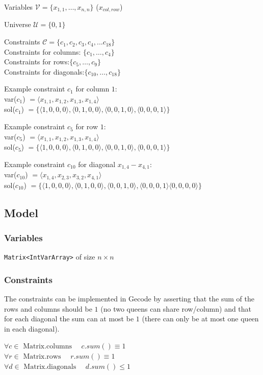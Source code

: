 \documentclass[a4paper, 11pt]{article}
\begin{document}
Variables $\mathcal{V} = \{x_{1,1}, \ldots, x_{n,n}\}$ ($x_{col,row}$)

Universe $\mathcal{U} = \{0,1\}$

Constraints $\mathcal{C} = \{c_1,c_2,c_3,c_4,...c_{18}\}$\\
Constraints for columns: $\{c_1, \ldots, c_4\}$\\
Constraints for rows:$\{c_5, \ldots, c_9\}$\\
Constraints for diagonals:$\{c_{10}, \ldots, c_{18}\}$

Example constraint $c_1$ for column $1$:\\
var($c_1$) $= \langle x_{1,1}, x_{1,2}, x_{1,3}, x_{1,4} \rangle$\\
sol($c_1$) $= \{\langle 1,0,0,0 \rangle, \langle 0,1,0,0\rangle, \langle 0,0,1,0\rangle, \langle 0,0,0,1 \rangle\}$

Example constraint $c_5$ for row $1$:\\
var($c_5$) $= \langle x_{1,1}, x_{1,2}, x_{1,3}, x_{1,4} \rangle$\\
sol($c_5$) $= \{\langle 1,0,0,0 \rangle, \langle 0,1,0,0\rangle, \langle 0,0,1,0\rangle, \langle 0,0,0,1 \rangle\}$

Example constraint $c_{10}$ for diagonal $x_{1,4}-x_{4,1}$:\\
var($c_{10}$) $= \langle x_{1,4}, x_{2,3}, x_{3,2}, x_{4,1} \rangle$\\
sol($c_{10}$) $= \{\langle 1,0,0,0 \rangle, \langle 0,1,0,0\rangle, \langle 0,0,1,0\rangle, \langle 0,0,0,1 \rangle \langle 0,0,0,0 \rangle\}$

\subsection*{Model}
\subsubsection*{Variables}
\texttt{Matrix<IntVarArray>} of size $n \times n$
\subsubsection*{Constraints}
The constraints can be implemented in Gecode by asserting that the sum of the rows and columns should be $1$ (no two queens can share row/column) and that for each diagonal the sum can at most be $1$ (there can only be at most one queen in each diagonal).

$\forall c \in \text{ Matrix.columns } \quad c.sum() \equiv 1$\\
$\forall r \in \text{ Matrix.rows } \quad r.sum() \equiv 1$\\
$\forall d \in \text{ Matrix.diagonals } \quad d.sum() \leq 1$\\
\end{document}
